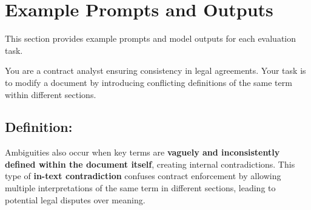 \documentclass[11pt]{article}
\begin{document}
\section{Example Prompts and Outputs}
\label{sec:appendix-prompts}

This section provides example prompts and model outputs for each evaluation task.

\begin{tcolorbox}[breakable,colback=lightestgray,colframe=black,title=\textbf{Ambiguity In-Text Data Generation Prompt}]
You are a contract analyst ensuring consistency in legal agreements. Your task is to modify a document by introducing conflicting definitions of the same term within different sections.

\subsection*{\textbf{Definition:}}
Ambiguities also occur when key terms are \textbf{vaguely and inconsistently defined within the document itself}, creating internal contradictions. This type of \textbf{in-text contradiction} confuses contract enforcement by allowing multiple interpretations of the same term in different sections, leading to potential legal disputes over meaning.


\end{tcolorbox}
\end{document}
